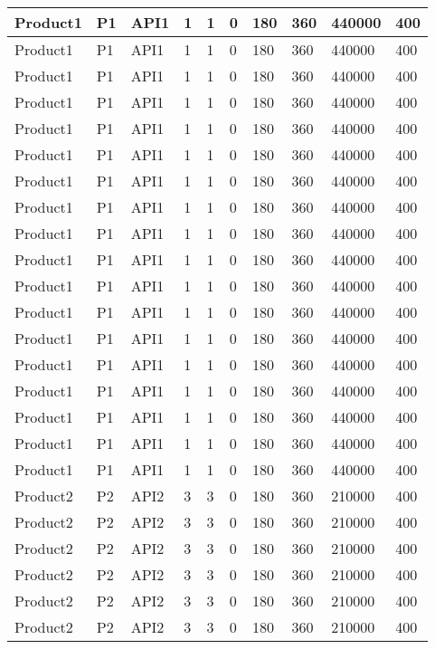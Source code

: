 \documentclass{article}
\begin{document}
\begin{longtable}[l]{|p{1.5cm}|p{1.7cm}|p{1cm}|p{1.5cm}|p{1.7cm}|p{1cm}|p{1cm}|p{1cm}|p{1cm}|p{1.5cm}|}
\hline
Product1 & P1 & API1 & 1 & 1 & 0 & 180 & 360 & 440000 & 400\\
\hline
Product1 & P1 & API1 & 1 & 1 & 0 & 180 & 360 & 440000 & 400\\
\hline
Product1 & P1 & API1 & 1 & 1 & 0 & 180 & 360 & 440000 & 400\\
\hline
Product1 & P1 & API1 & 1 & 1 & 0 & 180 & 360 & 440000 & 400\\
\hline
Product1 & P1 & API1 & 1 & 1 & 0 & 180 & 360 & 440000 & 400\\
\hline
Product1 & P1 & API1 & 1 & 1 & 0 & 180 & 360 & 440000 & 400\\
\hline
Product1 & P1 & API1 & 1 & 1 & 0 & 180 & 360 & 440000 & 400\\
\hline
Product1 & P1 & API1 & 1 & 1 & 0 & 180 & 360 & 440000 & 400\\
\hline
Product1 & P1 & API1 & 1 & 1 & 0 & 180 & 360 & 440000 & 400\\
\hline
Product1 & P1 & API1 & 1 & 1 & 0 & 180 & 360 & 440000 & 400\\
\hline
Product1 & P1 & API1 & 1 & 1 & 0 & 180 & 360 & 440000 & 400\\
\hline
Product1 & P1 & API1 & 1 & 1 & 0 & 180 & 360 & 440000 & 400\\
\hline
Product1 & P1 & API1 & 1 & 1 & 0 & 180 & 360 & 440000 & 400\\
\hline
Product1 & P1 & API1 & 1 & 1 & 0 & 180 & 360 & 440000 & 400\\
\hline
Product1 & P1 & API1 & 1 & 1 & 0 & 180 & 360 & 440000 & 400\\
\hline
Product1 & P1 & API1 & 1 & 1 & 0 & 180 & 360 & 440000 & 400\\
\hline
Product1 & P1 & API1 & 1 & 1 & 0 & 180 & 360 & 440000 & 400\\
\hline
Product1 & P1 & API1 & 1 & 1 & 0 & 180 & 360 & 440000 & 400\\
\hline
Product2 & P2 & API2 & 3 & 3 & 0 & 180 & 360 & 210000 & 400\\
\hline
Product2 & P2 & API2 & 3 & 3 & 0 & 180 & 360 & 210000 & 400\\
\hline
Product2 & P2 & API2 & 3 & 3 & 0 & 180 & 360 & 210000 & 400\\
\hline
Product2 & P2 & API2 & 3 & 3 & 0 & 180 & 360 & 210000 & 400\\
\hline
Product2 & P2 & API2 & 3 & 3 & 0 & 180 & 360 & 210000 & 400\\
\hline
Product2 & P2 & API2 & 3 & 3 & 0 & 180 & 360 & 210000 & 400\\

\end{longtable}
\end{document}
